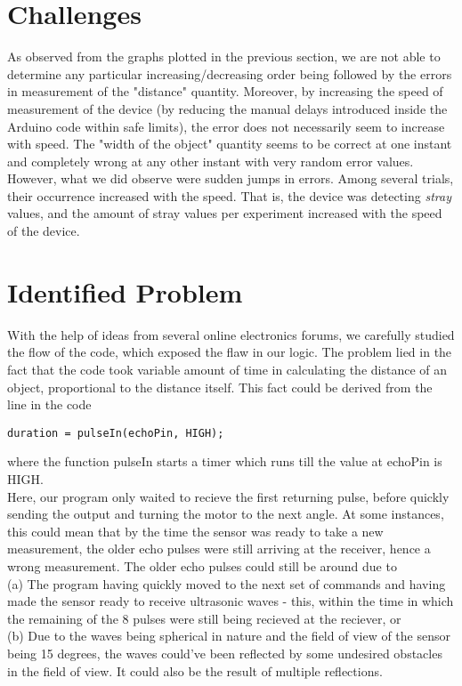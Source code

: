\section{Challenges}
As observed from the graphs plotted in the previous section, we are not able to determine any particular increasing/decreasing order being followed by the errors in measurement of the "distance" quantity. Moreover, by increasing the speed of measurement of the device (by reducing the manual delays introduced inside the Arduino code within safe limits), the error does not necessarily seem to increase with speed. The "width of the object" quantity seems to be correct at one instant and completely wrong at any other instant with very random error values.\\
However, what we did observe were sudden jumps in errors. Among several trials, their occurrence increased with the speed. That is, the device was detecting \textit{stray} values, and the amount of stray values per experiment increased with the speed of the device. 
\section{Identified Problem}
With the help of ideas from several online electronics forums, we carefully studied the flow of the code, which exposed the flaw in our logic. The problem lied in the fact that the code took variable amount of time in calculating the distance of an object, proportional to the distance itself. This fact could be derived from the line in the code\begin{verbatim}duration = pulseIn(echoPin, HIGH);\end{verbatim} where the function pulseIn starts a timer which runs till the value at echoPin is HIGH.\\
Here, our program only waited to recieve the first returning pulse, before quickly sending the output and turning the motor to the next angle. At some instances, this could mean that by the time the sensor was ready to take a new measurement, the older echo pulses were still arriving at the receiver, hence a wrong measurement. The older echo pulses could still be around due to \\
(a) The program having quickly moved to the next set of commands and having made the sensor ready to receive ultrasonic waves - this, within the time in which the remaining of the 8 pulses were still being recieved at the reciever, or \\
(b) Due to the waves being spherical in nature and the field of view of the sensor being 15 degrees, the waves could've been reflected by some undesired obstacles in the field of view. It could also be the result of multiple reflections.
